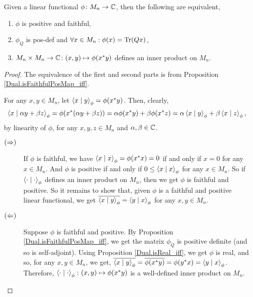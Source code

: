   \begin{theorem}\label{Dual.isFaithfulPosMap_tfae}
   Given a linear functional $\phi\colon{M_n}\to\mathbb{C}$, then the following are equivalent,
   \begin{enumerate}[label=(\roman*)]
    \item $\phi$ is positive and faithful,
    \item $\phi_Q$ is pos-def and $\forall{x}\in{M_n}:\phi(x)=\operatorname{Tr}(Qx)$,
    \item $M_n\times{M_n}\to\mathbb{C}\colon(x,y)\mapsto\phi(x^*y)$ defines an inner product on $M_n$.
   \end{enumerate}
  \end{theorem}
  \begin{proof}\leanok
   The equivalence of the first and second parts is from Proposition \ref{Dual.isFaithfulPosMap_iff}.
   
   For any $x,y\in{M_n}$, let $\left\langle x \mid y\right\rangle_\phi=\phi(x^*y)$.
   Then, clearly,
   \[\left\langle x \mid \alpha{y}+\beta{z}\right\rangle_\phi=\phi(x^*(\alpha{y}+\beta{z}))=\alpha\phi(x^*y)+\beta\phi(x^*z)=\alpha\left\langle x \mid y\right\rangle_\phi+\beta\left\langle x \mid z\right\rangle_\phi,\]
   by linearity of $\phi$, for any $x,y,z\in{M_n}$ and $\alpha,\beta\in\mathbb{C}$.
   \begin{description}
    \item[$(\Rightarrow)$]
     If $\phi$ is faithful, we have $\left\langle x \mid x\right\rangle_\phi=\phi(x^*x)=0$ if and only if $x=0$ for any $x\in{M_n}$.
     And $\phi$ is positive if and only if $0\leq\left\langle x \mid x\right\rangle_\phi$ for any $x\in{M_n}$. So if $\left\langle\cdot \mid \cdot\right\rangle_\phi$ defines an inner product on $M_n$, then we get $\phi$ is faithful and positive. So it remains to show that, given $\phi$ is a faithful and positive linear functional, we get $\overline{\left\langle x \mid y\right\rangle_\phi}=\left\langle y \mid x\right\rangle_\phi$ for any $x,y\in{M_n}$.
    \item[$(\Leftarrow)$]
     Suppose $\phi$ is faithful and positive. By Proposition \ref{Dual.isFaithfulPosMap_iff}, we get the matrix $\phi_Q$ is positive definite (and so is self-adjoint). Using Proposition \ref{Dual.isReal_iff}, we get $\phi$ is real, and so, for any $x,y\in{M_n}$, we get, $\overline{\left\langle x \mid y\right\rangle_\phi}=\overline{\phi(x^*y)}=\phi(y^*x)=\left\langle y \mid x\right\rangle_\phi$.
     Therefore, $\left\langle\cdot \mid \cdot\right\rangle_\phi\colon(x,y)\mapsto\phi(x^*y)$ is a well-defined inner product on $M_n$.
   \end{description}
  \end{proof}

